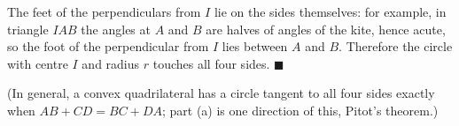 The feet of the perpendiculars from $I$ lie on the sides themselves: for example, in triangle $IAB$ the angles at $A$ and $B$ are halves of angles of the kite, hence acute, so the foot of the perpendicular from $I$ lies between $A$ and $B$. Therefore the circle with centre $I$ and radius $r$ touches all four sides. $\blacksquare$

(In general, a convex quadrilateral has a circle tangent to all four sides exactly when $AB+CD=BC+DA$; part (a) is one direction of this, Pitot's theorem.)

